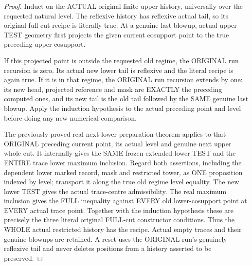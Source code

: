 \begin{proof}
Induct on the ACTUAL original finite upper history, universally over the
requested natural level. The reflexive history has reflexive actual tail,
so its original full-cut recipe is literally true. At a genuine last
blowup, actual upper TEST geometry first projects the given current
cosupport point to the true preceding upper cosupport.

If this projected point is outside the requested old regime, the ORIGINAL
run recursion is zero. Its actual new lower tail is reflexive and the
literal recipe is again true. If it is in that regime, the ORIGINAL run
recursion extends by one: its new head, projected reference and mask are
EXACTLY the preceding computed ones, and its new tail is the old tail
followed by the SAME genuine last blowup. Apply the induction hypothesis
to the actual preceding point and level before doing any new numerical
comparison.

The previously proved real next-lower preparation theorem applies to
that ORIGINAL preceding current point, its actual level and genuine next
upper whole cut. It internally gives the SAME frozen extended lower TEST
and the ENTIRE trace lower maximum inclusion. Regard both assertions,
including the dependent lower marked record, mask and restricted tower,
as ONE proposition indexed by level; transport it along the true old
regime level equality. The new lower TEST gives the actual trace-centre
admissibility. The real maximum inclusion gives the FULL inequality
against EVERY old lower-cosupport point at EVERY actual trace point.
Together with the induction hypothesis these are precisely the three
literal original FULL-cut constructor conditions. Thus the WHOLE actual
restricted history has the recipe. Actual empty traces and their genuine
blowups are retained. A reset uses the ORIGINAL run's genuinely reflexive
tail and never deletes positions from a history asserted to be preserved.
\end{proof}

